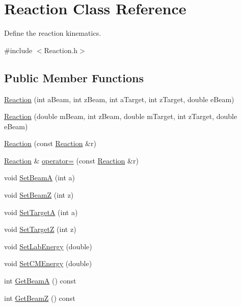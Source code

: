 \hypertarget{classReaction}{\section{Reaction Class Reference}
\label{classReaction}
}


Define the reaction kinematics.  




{\ttfamily \#include $<$Reaction.\-h$>$}

\subsection*{Public Member Functions}
\begin{DoxyCompactItemize}
\item 
\hyperlink{classReaction_a146838cd889af1ac4c886387e00ca179}{Reaction} (int a\-Beam, int z\-Beam, int a\-Target, int z\-Target, double e\-Beam)
\item 
\hyperlink{classReaction_a0d5cfc72f2a4520e4efe10e53a6195a3}{Reaction} (double m\-Beam, int z\-Beam, double m\-Target, int z\-Target, double e\-Beam)
\item 
\hyperlink{classReaction_ac409bbbb72a0464c7be007f55c4e5582}{Reaction} (const \hyperlink{classReaction}{Reaction} \&r)
\item 
\hyperlink{classReaction}{Reaction} \& \hyperlink{classReaction_ac84fba3eee1f6d4e8621e290066495e6}{operator=} (const \hyperlink{classReaction}{Reaction} \&r)
\item 
void \hyperlink{classReaction_a70b7eb982add06fb32a8cd951ada684e}{Set\-Beam\-A} (int a)
\item 
void \hyperlink{classReaction_a98ae08a899b1196f9829f72b617a9372}{Set\-Beam\-Z} (int z)
\item 
void \hyperlink{classReaction_aa7d800f5c5c57c6a3fb1e8ac90d8253f}{Set\-Target\-A} (int a)
\item 
void \hyperlink{classReaction_abed56e9280e840b0fe61f5e048537326}{Set\-Target\-Z} (int z)
\item 
void \hyperlink{classReaction_a0fe38599ec2bc9b0356c22c84893bd53}{Set\-Lab\-Energy} (double)
\item 
void \hyperlink{classReaction_abb5af6ec84b2f3c6eeb6c6d395e0d951}{Set\-C\-M\-Energy} (double)
\item 
int \hyperlink{classReaction_a7c76ebb705c968644153f78952c74844}{Get\-Beam\-A} () const 
\item 
int \hyperlink{classReaction_ad2d40436760c9f02cacf8289d82f7b44}{Get\-Beam\-Z} () const 

\end{DoxyCompactItemize}
